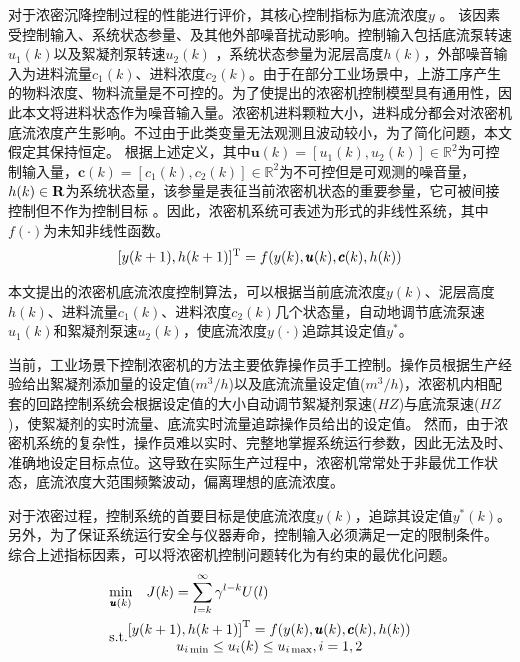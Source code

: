 对于浓密沉降控制过程的性能进行评价，其核心控制指标为底流浓度$y$ 。
该因素受控制输入、系统状态参量、及其他外部噪音扰动影响。控制输入包括底流泵转速$u_1(k)$以及絮凝剂泵转速$u_2(k)$
，系统状态参量为泥层高度$h(k)$，外部噪音输入为进料流量$c_1(k)$、进料浓度$c_2(k)$。由于在部分工业场景中，上游工序产生的物料浓度、物料流量是不可控的。为了使提出的浓密机控制模型具有通用性，因此本文将进料状态作为噪音输入量。浓密机进料颗粒大小，进料成分都会对浓密机底流浓度产生影响。不过由于此类变量无法观测且波动较小，为了简化问题，本文假定其保持恒定。
根据上述定义，其中$\pmb u(k)=[u_1(k),u_2(k)] \in
\mathbb{R}^2$为可控制输入量，$\pmb c(k)=[c_1(k),c_2(k)] \in
\mathbb{R}^2$为不可控但是可观测的噪音量，$h(k) \in \bf
R$为系统状态量，该参量是表征当前浓密机状态的重要参量，它可被间接控制但不作为控制目标
。因此，浓密机系统可表述为形式的非线性系统，其中$f
( \cdot )$为未知非线性函数。
\begin{equation}\label{equ:system_dynamic}
    [y ( k + 1 ), h(k+1)]^{\rm T} = f ( y(k), \pmb u ( k ) ,\pmb c ( k ) ,h(k))
\end{equation}


本文提出的浓密机底流浓度控制算法，可以根据当前底流浓度$y(k)$、泥层高度$h(k)$、进料流量$c_1(k)$、进料浓度$c_2(k)$几个状态量，自动地调节底流泵速$u_1(k)$和絮凝剂泵速$u_2(k)$，使底流浓度$y(\cdot)$追踪其设定值$y^*$。

当前，工业场景下控制浓密机的方法主要依靠操作员手工控制。操作员根据生产经验给出絮凝剂添加量的设定值($m^3/h$)以及底流流量设定值($m^3/h$)，浓密机内相配套的回路控制系统会根据设定值的大小自动调节絮凝剂泵速($HZ$)与底流泵速($HZ$)，使絮凝剂的实时流量、底流实时流量追踪操作员给出的设定值。
然而，由于浓密机系统的复杂性，操作员难以实时、完整地掌握系统运行参数，因此无法及时、准确地设定目标点位。这导致在实际生产过程中，浓密机常常处于非最优工作状态，底流浓度大范围频繁波动，偏离理想的底流浓度。

对于浓密过程，控制系统的首要目标是使底流浓度$y(k)$，追踪其设定值$y^*(k)$。另外，为了保证系统运行安全与仪器寿命，控制输入必须满足一定的限制条件。
综合上述指标因素，可以将浓密机控制问题转化为有约束的最优化问题。
\begin{equation}\label{equ:goal}
\begin{aligned}
&{\min_{\pmb u(k)}}\quad J(k)=\sum\limits_{l=k}^{\infty }{{{\gamma }^{l-k}}}U(l) \\
& \rm{s.t.}\begin{matrix}
   {{[y(k+1),h(k+1)]}^{\rm T}}=f(y(k),\pmb u(k),\pmb c(k),h(k))  \\
   {{u}_{i\min }}\le {{u}_{i}}(k)\le {{u}_{i\max }},i=1,2  \\
\end{matrix}
\end{aligned}
\end{equation}

